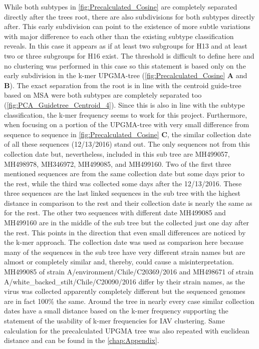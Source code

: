 While both subtypes in \autoref{fig:Precalculated_Cosine} are completely separated directly after the trees root, there are also subdivisions for both subtypes directly after. This early subdivision can point to the existence of more subtle variations with major difference to each other than the existing subtype classification reveals. In this case it appears as if at least two subgroups for H13 and at least two or three subgroups for H16 exist. The threshold is difficult to define here and no clustering was performed in this case so this statement is based only on the early subdivision in the k-mer \gls{UPGMA}-tree (\autoref{fig:Precalculated_Cosine} \textbf{\textsf{A}} and \textbf{\textsf{B}}). The exact separation from the root is in line with the centroid guide-tree based on \gls{MSA} were both subtypes are completely separated too (\autoref{fig:PCA_Guidetree_Centroid_4}). Since this is also in line with the subtype classification, the k-mer frequency seems to work for this project. Furthermore, when focusing on a portion of the \gls{UPGMA}-tree with very small difference from sequence to sequence in \autoref{fig:Precalculated_Cosine} \textbf{\textsf{C}}, the similar collection date of all these sequences (12/13/2016) stand out. The only sequences not from this collection date but, nevertheless, included in this sub tree are MH499057, MH498978, MH346972, MH499085, and MH499160. Two of the first three mentioned sequences are from the same collection date but some days prior to the rest, while the third was collected some days after the 12/13/2016. These three sequences are the last linked sequences in the sub tree with the highest distance in comparison to the rest and their collection date is nearly the same as for the rest. The other two sequences with different date MH499085 and MH499160 are in the middle of the sub tree but the collected just one day after the rest. This points in the direction that even small differences are noticed by the k-mer approach. The collection date was used as comparison here because many of the sequences in the sub tree have very different strain names but are almost or completely similar and, thereby, could cause a misinterpretation. MH499085 of strain A/environment/Chile/C20369/2016 and MH498671 of strain A/white\_backed\_stilt/Chile/C20090/2016 differ by their strain names, as the virus was collected apparently completely different but the sequenced genomes are in fact 100\% the same. Around the tree in nearly every case similar collection dates have a small distance based on the k-mer frequency supporting the statement of the usability of k-mer frequencies for \gls{IAV} clustering. Same calculation for the precalculated \gls{UPGMA} tree was also repeated with euclidean distance and can be found in the \autoref{chap:Appendix}.

